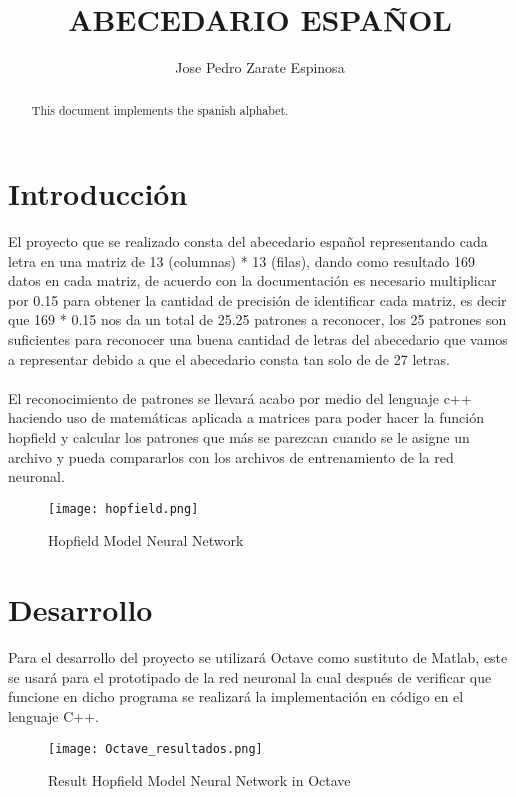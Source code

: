 \documentclass[10pt]{article}         %
\title{ABECEDARIO ESPAÑOL}
\author{Jose Pedro Zarate Espinosa}
\begin{document}
\maketitle

\begin{abstract}
This document implements the spanish alphabet.
\end{abstract}

\section{Introducción}
El proyecto que se realizado consta del abecedario español representando cada letra en una matriz de 13 (columnas) * 13 (filas), dando como resultado 169 datos en cada matriz, de acuerdo con la documentación es necesario multiplicar por 0.15 para obtener la cantidad de precisión de identificar cada matriz, es decir que  169 * 0.15  nos da un total de  25.25 patrones a reconocer, los 25 patrones son suficientes para reconocer una buena cantidad de letras del abecedario que vamos a representar debido a que el abecedario consta tan solo de de 27 letras.
\\
\\
El reconocimiento de patrones se llevará acabo por medio del lenguaje c++ haciendo uso de matemáticas aplicada a matrices para poder hacer la función hopfield y calcular los patrones que más se parezcan cuando se le asigne un archivo y pueda compararlos con los archivos de entrenamiento de la red neuronal.

\begin{figure}[htb]
\centering
\texttt{[image: hopfield.png]}
\caption{Hopfield Model Neural Network}
\label{fig:tigre}
\end{figure}



\section{Desarrollo}
Para el desarrollo del proyecto se utilizará Octave como sustituto de Matlab, este se usará para el prototipado de la red neuronal la cual después de verificar que funcione en dicho programa se realizará la implementación en código en el lenguaje C++.\\

\begin{figure}[htb]
\centering
\texttt{[image: Octave\_resultados.png]}
\caption{ Result Hopfield Model Neural Network in Octave}
\label{fig:tigre}
\end{figure}
\end{document}
